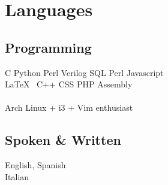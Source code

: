 \documentclass[]{deedy-resume-openfont}
\begin{document}
\sectionsep

\section{Languages}
\begin{minipage}[t]{.6\textwidth}
\subsection{Programming}
C \textbullet{} Python \textbullet{} Perl \textbullet{} Verilog \textbullet{}
SQL \textbullet{} Perl \textbullet{} Javascript\\ \LaTeX\ \textbullet{} C++ \textbullet{} CSS \textbullet{} PHP \textbullet{} Assembly \\
\\Arch Linux + i3 + Vim enthusiast 
\sectionsep
\end{minipage}
\hfill
\begin{minipage}[t]{.35\textwidth}
\subsection{Spoken \& Written}
 English, Spanish\\
 Italian\\
\end{minipage}
\end{document}
